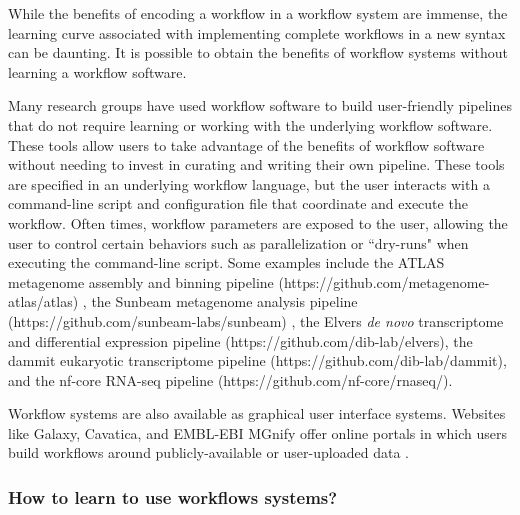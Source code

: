 \documentclass[10pt,letterpaper]{article}
\begin{document}
While the benefits of encoding a workflow in a workflow system are immense, the learning curve associated with implementing complete workflows in a new syntax can be daunting. 
It is possible to obtain the benefits of workflow systems without learning a workflow software.

Many research groups have used workflow software to build user-friendly pipelines that do not require learning or working with the underlying workflow software.
These tools allow users to take advantage of the benefits of workflow software without needing to invest in curating and writing their own pipeline. 
These tools are specified in an underlying workflow language, but the user interacts with a command-line script and configuration file that coordinate and execute the workflow. 
Often times, workflow parameters are exposed to the user, allowing the user to control certain behaviors such as parallelization or ``dry-runs" when executing the command-line script.
Some examples include the ATLAS metagenome assembly and binning pipeline (https://github.com/metagenome-atlas/atlas) \cite{kieser2019atlas}, the Sunbeam metagenome analysis pipeline (https://github.com/sunbeam-labs/sunbeam) \cite{clarke2019sunbeam}, the Elvers \textit{de novo} transcriptome and differential expression pipeline (https://github.com/dib-lab/elvers), the dammit eukaryotic transcriptome pipeline (https://github.com/dib-lab/dammit), and the nf-core RNA-seq pipeline (https://github.com/nf-core/rnaseq/). 

Workflow systems are also available as graphical user interface systems.
Websites like Galaxy, Cavatica, and EMBL-EBI MGnify offer online portals in which users build workflows around publicly-available or user-uploaded data \cite{afgan2018galaxy, volchenboum2017data, mitchell2020mgnify}.

\subsubsection*{How to learn to use workflows systems?}
\end{document}
